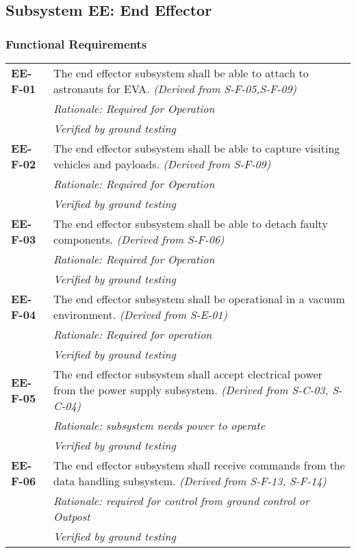 \subsection{Subsystem EE: End Effector}
\label{sect:EE_req}
\subsubsection*{Functional Requirements}
\vspace{-15pt}
\begin{longtable}{P{2cm}P{13.25cm}}
\textbf{EE-F-01}	&
The end effector subsystem shall be able to attach to astronauts for \gls{EVA}.
\textit{(Derived from S-F-05,S-F-09)}	\\
& \textit{Rationale: Required for Operation}\\
& \textit{Verified by ground testing}	\\

\textbf{EE-F-02}	& The end effector subsystem shall be able to capture visiting vehicles and payloads.
\textit{(Derived from S-F-09)}	\\
& \textit{Rationale: Required for Operation}\\
& \textit{Verified by ground testing}	\\

\textbf{EE-F-03}	&
The end effector subsystem shall be able to detach faulty components.
\textit{(Derived from S-F-06)}	\\
& \textit{Rationale: Required for Operation}\\
& \textit{Verified by ground testing}	\\

\textbf{EE-F-04}	&
The end effector subsystem shall be operational in a vacuum environment.
\textit{(Derived from S-E-01)}	\\
& \textit{Rationale: Required for operation}	\\
& \textit{Verified by ground testing}	\\

\textbf{EE-F-05}	& The end effector subsystem shall accept electrical power from the power supply subsystem. 
\textit{(Derived from S-C-03, S-C-04)}	\\
& \textit{Rationale: subsystem needs power to operate}	\\
& \textit{Verified by ground testing}	\\

\textbf{EE-F-06}	& The end effector subsystem shall receive commands from the data handling subsystem. 
\textit{(Derived from S-F-13, S-F-14)}\\ 
& \textit{Rationale: required for control from ground control or Outpost}\\
& \textit{Verified by ground testing}	\\


\end{longtable}

